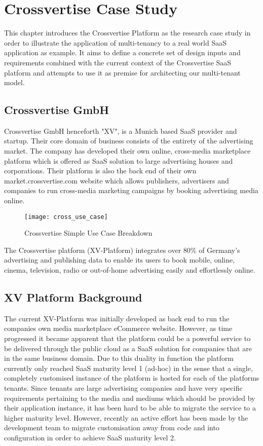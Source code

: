 \chapter{Crossvertise Case Study}
This chapter introduces the Crossvertise Platform as the research case study in order to illustrate the application of multi-tenancy to a real world SaaS application as example. It aims to define a concrete set of design inputs and requirements combined with the current context of the Crossvertise SaaS platform and attempts to use it as premise for architecting our multi-tenant model. 

\section{Crossvertise GmbH}
Crossvertise GmbH henceforth "XV", is a Munich based SaaS provider and startup. Their core domain of business consists of the entirety of the advertising market. The company has developed their own online, cross-media marketplace platform which is offered as SaaS solution to large advertising houses and corporations. Their platform is also the back end of their own  market.crossvertise.com website which allows publishers, advertisers and companies to run cross-media marketing campaigns by booking advertising media online.


\begin{figure}
\centering
\texttt{[image: cross\_use\_case]}
\caption{Crossvertise Simple Use Case Breakdown}
\label{fig:xv_use_case}
\end{figure}

The Crossvertise platform (XV-Platform) integrates over 80\% of Germany's advertising and publishing data to enable its users to book mobile, online, cinema, television, radio or out-of-home advertising easily and effortlessly online. 

\section{XV Platform Background}
The current XV-Platform was initially developed as back end to run the companies own media marketplace eCommerce website. However, as time progressed it became apparent that the platform could be a powerful service to be delivered through the public cloud as a SaaS solution for companies that are in the same business domain. Due to this duality in function the platform currently only reached SaaS maturity level 1 (ad-hoc) \cite{Chong2006} in the sense that a single, completely customised instance of the platform is hosted for each of the platforms tenants. Since tenants are large advertising companies and have very specific requirements pertaining to the media and mediums which should be provided by their application instance, it has been hard to be able to migrate the service to a higher maturity level. However, recently an active effort has been made by the development team to migrate customisation away from code and into configuration in order to achieve SaaS maturity level 2. 


